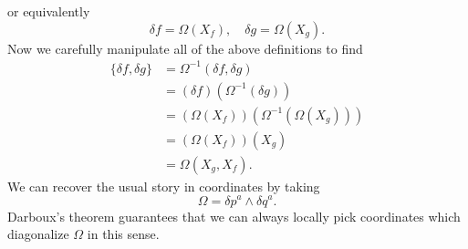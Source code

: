 \documentclass[11pt,letterpaper]{article}
\newcommand{\LP}{\left(}
\newcommand{\RP}{\right)}
\begin{document}
or equivalently \begin{equation}
\delta f = \Omega(X_f), \quad \delta g = \Omega(X_g).
\end{equation}
Now we carefully manipulate all of the above definitions to find \begin{equation}
\begin{aligned}
\{\delta f, \delta g \} & = \Omega^{-1} (\delta f, \delta g) \\
& = (\delta f) \LP \Omega^{-1} (\delta g) \RP  \\
& = (\Omega (X_f)) \LP \Omega^{-1} (\Omega (X_g)) \RP \\
& = (\Omega(X_f)) (X_g) \\
& = \Omega(X_g, X_f).
\end{aligned}
\end{equation}
We can recover the usual story in coordinates by taking \begin{equation}
\Omega = \delta p^a \wedge \delta q^a.
\end{equation}
Darboux's theorem guarantees that we can always locally pick coordinates which diagonalize $\Omega$ in this sense.
\end{document}
